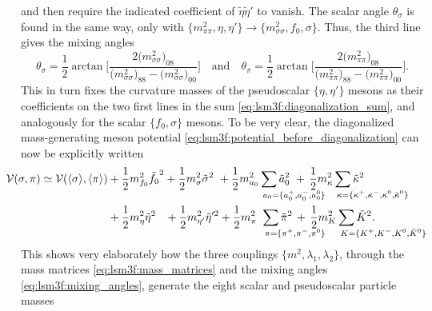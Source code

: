 and then require the indicated coefficient of $\tilde{\eta} \tilde{\eta}'$ to vanish.
The scalar angle $\theta_\sigma$ is found in the same way, only with
$\{m^2_{\pi\pi}, \eta, \eta'\} \rightarrow \{m^2_{\sigma\sigma}, f_0, \sigma\}$.
Thus, the third line gives the mixing angles
\begin{equation}
	\theta_\sigma = \frac12 \arctan \Bigg[ \frac{2\big(m^2_{\sigma\sigma}\big)_{08}}{\big(m^2_{\sigma\sigma}\big)_{88} - \big(m^2_{\sigma\sigma}\big)_{00}} \Bigg]
	\quad \text{and} \quad
	\theta_\pi = \frac12 \arctan \Bigg[ \frac{2\big(m^2_{\pi\pi}\big)_{08}}{\big(m^2_{\pi\pi}\big)_{88} - \big(m^2_{\pi\pi}\big)_{00}} \Bigg].
\label{eq:lsm3f:mixing_angles}
\end{equation}
This in turn fixes the curvature masses of the pseudoscalar $\{\eta,\eta'\}$ mesons
as their coefficients on the two first lines in the sum \eqref{eq:lsm3f:diagonalization_sum},
and analogously for the scalar $\{f_0,\sigma\}$ mesons.
To be very clear,
the diagonalized mass-generating meson potential \eqref{eq:lsm3f:potential_before_diagonalization} can now be explicitly written
\begin{equation}
\begin{split}
	\hspace{-2cm} \pot(\sigma,\pi) \taylor \pot(\avg{\sigma},\avg{\pi}) &+ \frac12 m^2_{f_0} \tilde{f_0}^2  + \frac12 m^2_{\sigma} \tilde{\sigma}^2 \,\, + \frac12 m^2_{a_0} \sum_{\mathrlap{\!\!\!\!a_0 = \{a_0^+,a_0^-,a_0^0\}}} \tilde{a}_0^2               \,\, + \, \frac12 m^2_{\kappa} \sum_{\mathrlap{\!\!\!\!\kappa = \{\kappa^+,\kappa^-,\kappa^0,\bar{\kappa}^0\}}} \tilde{\kappa}^2 \\
	                                                                    &+ \frac12 m^2_{\eta} \tilde{\eta}^2 \,\,\,\,\, + \frac12 m^2_{\eta'} \tilde{\eta}'^2 + \frac12 m^2_{\pi_{\phantom{0}}} \sum_{\mathrlap{\!\!\!\!\pi = \{\pi^+,\pi^-,\pi^0\}}} \tilde{\pi}^2 \, + \, \frac12 m^2_{K} \sum_{\mathrlap{\!\!\!\!K = \{K^+,K^-,K^0,\bar{K}^0\}}} \tilde{K}^2. \\
\end{split}
\label{eq:lsm3f:potential_after_diagonalization}
\end{equation}
This shows very elaborately how the three couplings $\{m^2, \lambda_1, \lambda_2\}$,
through the mass matrices \eqref{eq:lsm3f:mass_matrices} and the mixing angles \eqref{eq:lsm3f:mixing_angles},
generate the eight scalar and pseudoscalar particle masses
